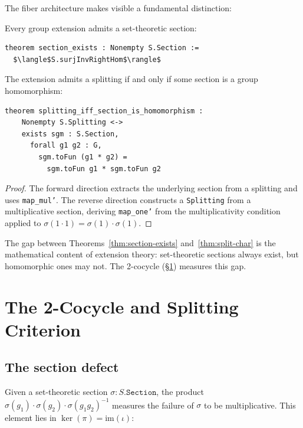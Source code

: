 \documentclass[11pt]{article}
\newcommand{\im}{\mathrm{im}}
\newcommand{\lean}[1]{\texttt{#1}}
\begin{document}
The fiber architecture makes visible a fundamental distinction:

\begin{theorem}\label{thm:section-exists}
Every group extension admits a set-theoretic section:
\begin{lstlisting}[mathescape=true]
theorem section_exists : Nonempty S.Section :=
  $\langle$S.surjInvRightHom$\rangle$
\end{lstlisting}
\end{theorem}

\begin{theorem}\label{thm:split-char}
The extension admits a splitting if and only if some section is a group homomorphism:
\begin{lstlisting}
theorem splitting_iff_section_is_homomorphism :
    Nonempty S.Splitting <->
    exists sgm : S.Section,
      forall g1 g2 : G,
        sgm.toFun (g1 * g2) =
          sgm.toFun g1 * sgm.toFun g2
\end{lstlisting}
\end{theorem}

\begin{proof}
The forward direction extracts the underlying section from a splitting and uses
\lean{map\_mul'}.  The reverse direction constructs a \lean{Splitting} from a
multiplicative section, deriving \lean{map\_one'} from the multiplicativity
condition applied to $\sigma(1 \cdot 1) = \sigma(1) \cdot \sigma(1)$.
\end{proof}

The gap between Theorems~\ref{thm:section-exists} and~\ref{thm:split-char} is
the mathematical content of extension theory: set-theoretic sections always exist,
but homomorphic ones may not.  The 2-cocycle (\S\ref{sec:cocycle}) measures this gap.

\section{The 2-Cocycle and Splitting Criterion}\label{sec:cocycle}

\subsection{The section defect}\label{sec:defect}

Given a set-theoretic section $\sigma : S.\lean{Section}$, the product
$\sigma(g_1) \cdot \sigma(g_2) \cdot \sigma(g_1 g_2)^{-1}$ measures the failure
of $\sigma$ to be multiplicative.  This element lies in $\ker(\pi) = \im(\iota)$:
\end{document}
